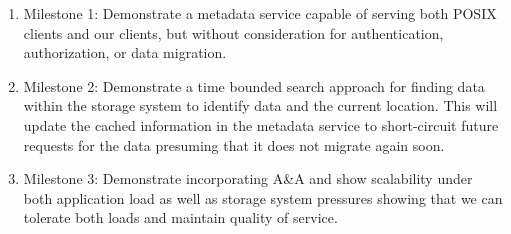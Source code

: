 \begin{enumerate}

\item Milestone 1: Demonstrate a metadata service capable of serving both POSIX
clients and our clients, but without consideration for authentication,
authorization, or data migration.

\item Milestone 2: Demonstrate a time bounded search approach for finding data
within the storage system to identify data and the current location.  This will
update the cached information in the metadata service to short-circuit future
requests for the data presuming that it does not migrate again soon.

\item Milestone 3: Demonstrate incorporating A\&A and show scalability under
both application load as well as storage system pressures showing that we can
tolerate both loads and maintain quality of service.

\end{enumerate}

